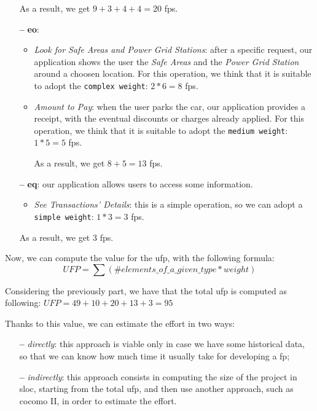 \begin{itemize}
As a result, we get $9 + 3 + 4 + 4 = 20$ \acs{fp}s.

\item[\textbf{--}] \textbf{\acl{eo}}: 

\begin{itemize}

	\item \textit{Look for Safe Areas and Power Grid Stations}: after a specific request, our application shows the user the \textit{Safe Areas} and the \textit{Power Grid Station}  around a choosen location. For this operation, we think that it is suitable to adopt the \texttt{complex weight}: $2 * 6 = 8$ \acs{fp}s.
	
	\item \textit{Amount to Pay}: when the user parks the car, our application provides a receipt, with the eventual discounts or charges already applied. For this operation, we think that it is suitable to adopt the \texttt{medium weight}: $1 * 5 = 5$ \acs{fp}s.

As a result, we get $8 + 5 = 13$ \acs{fp}s.

\end{itemize}

\item[\textbf{--}] \textbf{\acl{eq}}: our application allows users to access some information. 

\begin{itemize}

	\item \textit{See Transactions' Details}: this is a simple operation, so we can adopt a \texttt{simple weight}: $1 * 3 = 3$ \acs{fp}s.
\end{itemize}

As a result, we get $3$ \acs{fp}s.

\end{itemize}

Now, we can compute the value for the \acl{ufp}, with the following formula:
\[ UFP = \sum (\#elements\_of\_a\_given\_type * weight)\]

Considering the previously part, we have that the total \acs{ufp} is computed as following:
$UFP = 49 + 10 + 20 + 13 + 3 = 95$

Thanks to this value, we can estimate the effort in two ways:

\begin{itemize}

\item[\textbf{--}] \textit{directly}: this approach is viable only in case we have some historical data, so that we can know how much time it usually take for developing a \acs{fp};

\item[\textbf{--}] \textit{indirectly}: this approach consists in computing the size of the project in \acl{sloc}, starting from the total \acs{ufp}, and then use another approach, such as \acs{cocomo} II, in order to estimate the effort.

\end{itemize}

